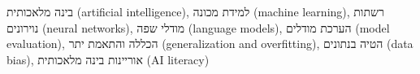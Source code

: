 בינה מלאכותית (artificial intelligence), למידת מכונה (machine learning), רשתות נוירונים (neural networks), מודלי שפה (language models), הערכת מודלים (model evaluation), הכללה והתאמת יתר (generalization and overfitting), הטיה בנתונים (data bias), אוריינות בינה מלאכותית (AI literacy)
